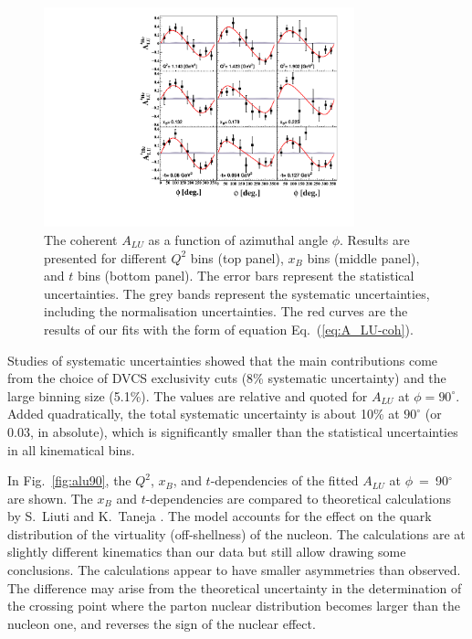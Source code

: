 \documentclass[twocolumn,nofootinbib,showpacs,prl,superscriptaddress,secnumarabic,amssymb,nobibnotes,aps,floatfix]{revtex4}
\begin{document}
\begin{figure}[tb]
\includegraphics[width=9cm]{figs/F_Coherent_ALU_phi.pdf}
\caption{The coherent $A_{LU}$ as a function of azimuthal angle $\phi$. Results are presented
   for different $Q^{2}$ bins (top panel), $x_{B}$ bins (middle panel), and $t$ 
   bins (bottom panel).  The error bars represent the statistical 
   uncertainties. The grey bands represent the systematic uncertainties, 
   including the normalisation uncertainties. The red curves are the results of 
our fits with the form of equation Eq.~(\ref{eq:A_LU-coh}).}
\label{fig:alu}
\end{figure}

Studies of systematic uncertainties showed that the main contributions 
come from the choice of DVCS exclusivity cuts (8\% systematic uncertainty) and the 
large binning size (5.1\%). The values are relative and quoted for $A_{LU}$
at $\phi=90^\circ$. Added quadratically, the total systematic uncertainty
is about 10\% at $90^\circ$ (or 0.03, in absolute), which is significantly smaller
than the statistical uncertainties in all kinematical bins. 

In Fig.~\ref{fig:alu90}, the $Q^2$, $x_{B}$, and $t$-dependencies of the fitted 
$A_{LU}$ at $\phi$~=~90$^{\circ}$ are shown. The $x_{B}$ and $t$-dependencies 
are compared to theoretical calculations by S.~Liuti and K.~Taneja 
\cite{simonetta_2}. The model accounts for the effect on the quark distribution 
of the virtuality (off-shellness) of the nucleon. The calculations are at slightly 
different kinematics than our data but still allow drawing some conclusions. The 
calculations appear to have smaller asymmetries than observed. 
The difference may arise from the theoretical uncertainty in the determination 
of the crossing point where the parton nuclear distribution becomes larger than the 
nucleon one, and reverses the sign of the nuclear effect.
\end{document}
